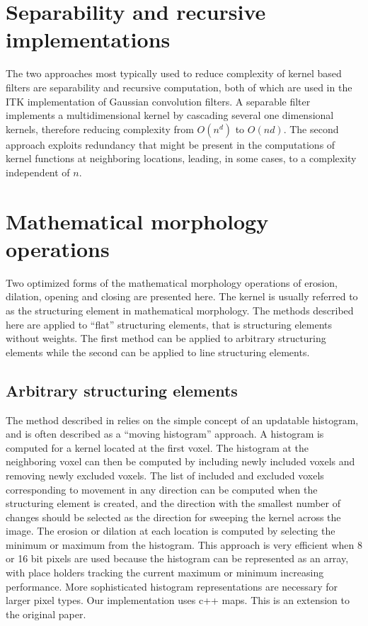 \documentclass{InsightArticle}
\begin{document}
\section{Separability and recursive implementations}
The two approaches most typically used to reduce complexity of kernel
based filters are separability and recursive computation, both of
which are used in the ITK implementation of Gaussian convolution
filters. A separable filter implements a multidimensional kernel by
cascading several one dimensional kernels, therefore reducing
complexity from $O(n^d)$ to $O(nd)$. The second approach exploits
redundancy that might be present in the computations of kernel
functions at neighboring locations, leading, in some cases, to a complexity
independent of $n$.

\section{Mathematical morphology operations}
Two optimized forms of the mathematical morphology operations of
erosion, dilation, opening and closing are presented here. The kernel
is usually referred to as the structuring element in mathematical
morphology. The methods described here are applied to ``flat''
structuring elements, that is structuring elements without
weights. The first method can be applied to arbitrary structuring
elements while the second can be applied to line structuring elements.

\subsection{Arbitrary structuring elements}
\label{sect:MMmovingHist}
The method described in \cite{Vandroogenbroeck96.3} relies on the
simple concept of an updatable histogram, and is often described as a
``moving histogram'' approach. A histogram is computed for a kernel
located at the first voxel. The histogram at the neighboring voxel can
then be computed by including newly included voxels and removing newly
excluded voxels. The list of included and excluded voxels
corresponding to movement in any direction can be computed when the
structuring element is created, and the direction with the smallest
number of changes should be selected as the direction for sweeping the
kernel across the image. The erosion or dilation at each location is
computed by selecting the minimum or maximum from the histogram. This
approach is very efficient when 8 or 16 bit pixels are used because
the histogram can be represented as an array, with place holders
tracking the current maximum or minimum increasing performance. More
sophisticated histogram representations are necessary for larger pixel
types. Our implementation uses c++ maps. This is an extension to the
original paper.
\end{document}
